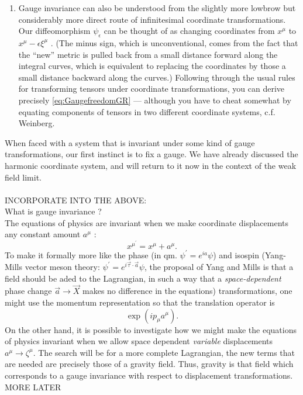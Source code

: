 \begin{enumerate}
\item Gauge invariance can also be understood from the slightly more lowbrow but considerably
more direct route of infinitesimal coordinate transformations. Our diffeomorphism $ψ_\epsilon$ can
be thought of as changing coordinates from $x^μ$ to $x^μ − \epsilon ξ^μ$ . (The minus sign, which is
unconventional, comes from the fact that the “new” metric is pulled back from a small
distance forward along the integral curves, which is equivalent to replacing the coordinates
by those a small distance backward along the curves.) Following through the usual rules for
transforming tensors under coordinate transformations, you can derive precisely \ref{eq:GaugefreedomGR} —
although you have to cheat somewhat by equating components of tensors in two different
coordinate systems, c.f. Weinberg.
\end{enumerate}
When faced with a system that is invariant under some kind of gauge transformations,
our first instinct is to fix a gauge. We have already discussed the harmonic coordinate
system, and will return to it now in the context of the weak field limit.
\\
\\
INCORPORATE INTO THE ABOVE:\\
What is gauge invariance ?\\
The equations of physics are invariant when we make  coordinate displacements any constant amount $a^\mu$ :
\begin{equation}
x^{\mu^\prime} = x^\mu +a^\mu.
\end{equation}
To make it formally more like the phase (in qm. $\psi^\prime = e^{ia} \psi$) and isospin (Yang-Mills vector meson theory: $\psi^\prime = e^{i \vec{\tau}\cdot \vec{a}} \psi$, the proposal of Yang and Mills is that a field should be aded to the Lagrangian, in such a way that a \emph{space-dependent} phase change $\vec{a}\rightarrow \vec{X}$ makes no difference in the equations) transformations, one might use the momentum representation so that the translation operator is
\begin{equation}
\exp(i p_\mu a^\mu).
\end{equation}
On the other hand, it is possible to investigate how we might make the equations of physics invariant when we allow space dependent \emph{variable} displacements $a^\mu \rightarrow \zeta^\mu$. The search will be for a more complete Lagrangian, the new terms that are needed are precisely those of a gravity field. Thus, gravity is that field which corresponds to a gauge invariance with respect to displacement transformations. MORE LATER






